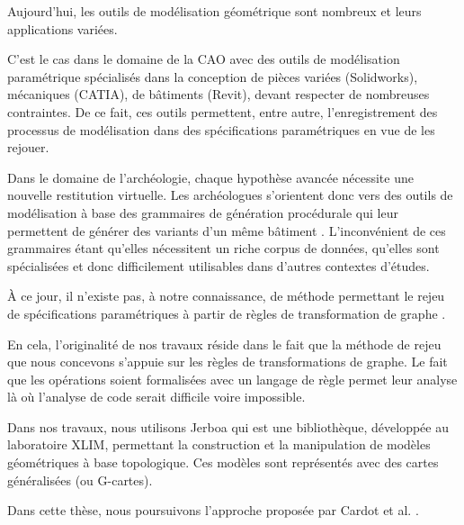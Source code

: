 Aujourd'hui, les outils de modélisation géométrique sont nombreux et leurs
applications variées. %

C'est le cas dans le domaine de la CAO avec des outils de modélisation
paramétrique spécialisés dans la conception de pièces variées (Solidworks),
mécaniques (CATIA), de bâtiments (Revit), devant respecter de nombreuses
contraintes. %
De ce fait, ces outils permettent, entre autre, l'enregistrement des processus
de modélisation dans des spécifications paramétriques en vue de les rejouer. %

Dans le domaine de l'archéologie, chaque hypothèse avancée nécessite une
nouvelle restitution virtuelle. %
Les archéologues s'orientent donc vers des outils de modélisation à base des
grammaires de génération procédurale qui leur permettent de générer des variants
d'un même bâtiment \cite{Quattrini_Baleani_2015}. %
L'inconvénient de ces grammaires étant qu'elles nécessitent un riche corpus de
données, qu'elles sont spécialisées et donc difficilement utilisables dans
d'autres contextes d'études. %

À ce jour, il n'existe pas, à notre connaissance, de méthode permettant le rejeu
de spécifications paramétriques à partir de règles de transformation de graphe \cite{ehrig2006fundamentals}.

En cela, l'originalité de nos travaux réside dans le fait que la méthode de
rejeu que nous concevons s'appuie sur les règles de transformations de graphe. %
Le fait que les opérations soient formalisées avec un langage de règle permet
leur analyse là où l'analyse de code serait difficile voire impossible. %

Dans nos travaux, nous utilisons Jerboa \cite{belhaouari2014jerboa} qui est une
bibliothèque, développée au laboratoire XLIM, permettant la construction et la
manipulation de modèles géométriques à base topologique. %
Ces modèles sont représentés avec des cartes généralisées
\cite{lienhardt1991topological,Damiand-Lienhardt14} (ou G-cartes). %

Dans cette thèse, nous poursuivons l'approche proposée par Cardot et al.
\cite{cardo2019}. %

